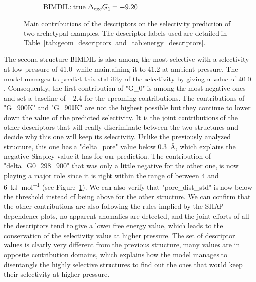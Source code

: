 \documentclass[main]{subfiles}
\begin{document}
\begin{figure}[ht]
\begin{subfigure}[b]{0.47\textwidth}
      \caption{BIMDIL: true $\Delta_{\text{exc}} G_1=-9.20$}
    \end{subfigure}
  \caption{Main contributions of the descriptors on the selectivity prediction of two archetypal examples. The descriptor labels used are detailed in Table~\ref{tab:geom_descriptors} and~\ref{tab:energy_descriptors}.}\label{fgr:contribution}
\end{figure}

The second structure BIMDIL is also among the most selective with a selectivity at low pressure of $41.0$, while maintaining it to $41.2$ at ambient pressure. The model manages to predict this stability of the selectivity by giving a value of $40.0$. Consequently, the first contribution of "G\_0" is among the most negative ones and set a baseline of $-2.4$ for the upcoming contributions. The contributions of "G\_900K" and "G\_900K" are not the highest possible but they continue to lower down the value of the predicted selectivity. It is the joint contributions of the other descriptors that will really discriminate between the two structures and decide why this one will keep its selectivity. Unlike the previously analyzed structure, this one has a "delta\_pore" value below \SI{0.3}{\angstrom}, which explains the negative Shapley value it has for our prediction. The contribution of "delta\_G0\_298\_900" that was only a little negative for the other one, is now playing a major role since it is right within the range of between $4$ and \SI{6}{\kilo\joule\per\mole} (see Figure~\ref{fgr:contribution}). We can also verify that "pore\_dist\_std" is now below the threshold instead of being above for the other structure. We can confirm that the other contributions are also following the rules implied by the SHAP dependence plots, no apparent anomalies are detected, and the joint efforts of all the descriptors tend to give a lower free energy value, which leads to the conservation of the selectivity value at higher pressure. The set of descriptor values is clearly very different from the previous structure, many values are in opposite contribution domains, which explains how the model manages to disentangle the highly selective structures to find out the ones that would keep their selectivity at higher pressure.
\end{document}
